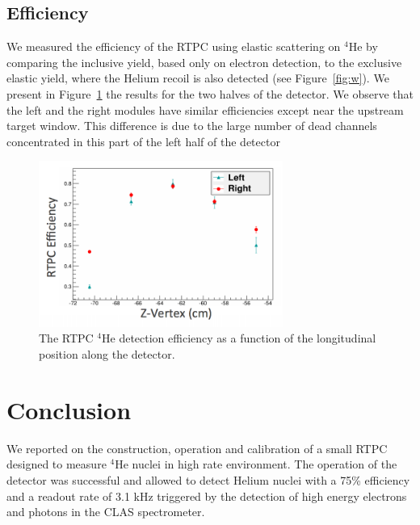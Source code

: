 \documentclass[preprint,5p]{elsarticle}
\begin{document}
\subsection{Efficiency}

We measured the efficiency of the RTPC
using elastic scattering on $^4$He by comparing the inclusive yield, based
only on electron detection, to the exclusive elastic yield, where the Helium
recoil is also detected (see Figure~\ref{fig:w}). We present in 
Figure~\ref{fig:rtpc_eff} the results for the two halves of the detector. We 
observe that the left and the right modules have similar efficiencies except 
near the upstream target window. This difference is due to the large number of 
dead channels concentrated in this part of the left half of the detector

\begin{figure}[tb]
\centering
\includegraphics[width=8cm]{tpceff.png}
\caption{The RTPC $^4$He detection efficiency as a function of the longitudinal 
   position along the detector.
 \label{fig:rtpc_eff}}
 \end{figure}


 \section{Conclusion}

We reported on the construction, operation and calibration of a small RTPC 
designed to measure $^4$He nuclei in high rate environment. The operation
of the detector was successful and allowed to detect Helium nuclei with a 75\%
efficiency and a readout rate
of 3.1 kHz triggered by the detection of high energy electrons and 
photons in the CLAS spectrometer. 

  
\end{document}
